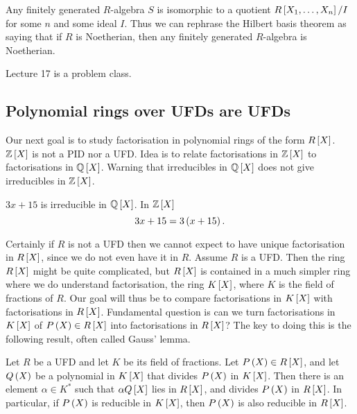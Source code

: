 \begin{note*}
Any finitely generated $ R $-algebra $ S $ is isomorphic to a quotient $ R\sb{X_1, \dots, X_n} / I $ for some $ n $ and some ideal $ I $. Thus we can rephrase the Hilbert basis theorem as saying that if $ R $ is Noetherian, then any finitely generated $ R $-algebra is Noetherian.
\end{note*}


Lecture 17 is a problem class.


\subsection{Polynomial rings over UFDs are UFDs}

Our next goal is to study factorisation in polynomial rings of the form $ R\sb{X} $. $ \Z\sb{X} $ is not a PID nor a UFD. Idea is to relate factorisations in $ \Z\sb{X} $ to factorisations in $ \Q\sb{X} $. Warning that irreducibles in $ \Q\sb{X} $ does not give irreducibles in $ \Z\sb{X} $.

\begin{example*}
$ 3x + 15 $ is irreducible in $ \Q\sb{X} $. In $ \Z\sb{X} $
$$ 3x + 15 = 3\rb{x + 15}. $$
\end{example*}

Certainly if $ R $ is not a UFD then we cannot expect to have unique factorisation in $ R\sb{X} $, since we do not even have it in $ R $. Assume $ R $ is a UFD. Then the ring $ R\sb{X} $ might be quite complicated, but $ R\sb{X} $ is contained in a much simpler ring where we do understand factorisation, the ring $ K\sb{X} $, where $ K $ is the field of fractions of $ R $. Our goal will thus be to compare factorisations in $ K\sb{X} $ with factorisations in $ R\sb{X} $. Fundamental question is can we turn factorisations in $ K\sb{X} $ of $ P\rb{X} \in R\sb{X} $ into factorisations in $ R\sb{X} $? The key to doing this is the following result, often called Gauss' lemma.

\begin{theorem}
\label{thm:9.2.1}
Let $ R $ be a UFD and let $ K $ be its field of fractions. Let $ P\rb{X} \in R\sb{X} $, and let $ Q\rb{X} $ be a polynomial in $ K\sb{X} $ that divides $ P\rb{X} $ in $ K\sb{X} $. Then there is an element $ \alpha \in K^* $ such that $ \alpha Q\sb{X} $ lies in $ R\sb{X} $, and divides $ P\rb{X} $ in $ R\sb{X} $. In particular, if $ P\rb{X} $ is reducible in $ K\sb{X} $, then $ P\rb{X} $ is also reducible in $ R\sb{X} $.
\end{theorem}

